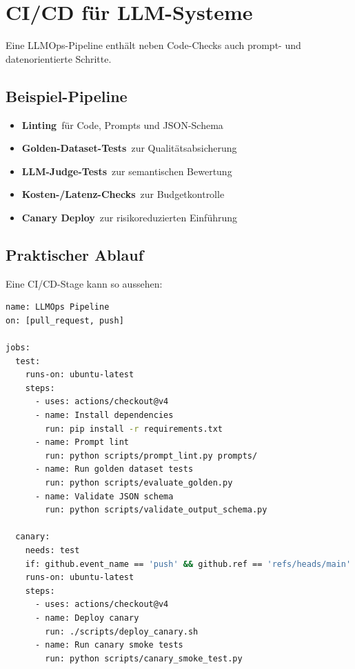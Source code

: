 \section{CI/CD für LLM-Systeme}

Eine LLMOps-Pipeline enthält neben Code-Checks auch prompt- und datenorientierte Schritte.

\subsection{Beispiel-Pipeline}

\begin{itemize}[leftmargin=*]
    \item \textbf{Linting}\ für Code, Prompts und JSON-Schema
    \item \textbf{Golden-Dataset-Tests}\ zur Qualitätsabsicherung
    \item \textbf{LLM-Judge-Tests}\ zur semantischen Bewertung
    \item \textbf{Kosten-/Latenz-Checks}\ zur Budgetkontrolle
    \item \textbf{Canary Deploy}\ zur risikoreduzierten Einführung
\end{itemize}

\subsection{Praktischer Ablauf}

Eine CI/CD-Stage kann so aussehen:

\begin{lstlisting}[language=Bash,caption={Beispiel-Workflow für LLMOps in GitHub Actions}]
name: LLMOps Pipeline
on: [pull_request, push]

jobs:
  test:
    runs-on: ubuntu-latest
    steps:
      - uses: actions/checkout@v4
      - name: Install dependencies
        run: pip install -r requirements.txt
      - name: Prompt lint
        run: python scripts/prompt_lint.py prompts/
      - name: Run golden dataset tests
        run: python scripts/evaluate_golden.py
      - name: Validate JSON schema
        run: python scripts/validate_output_schema.py

  canary:
    needs: test
    if: github.event_name == 'push' && github.ref == 'refs/heads/main'
    runs-on: ubuntu-latest
    steps:
      - uses: actions/checkout@v4
      - name: Deploy canary
        run: ./scripts/deploy_canary.sh
      - name: Run canary smoke tests
        run: python scripts/canary_smoke_test.py
\end{lstlisting}

